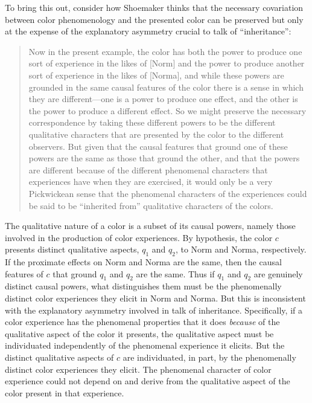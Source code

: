 \documentclass[12pt]{article}
\begin{document}
To bring this out, consider how Shoemaker thinks that the necessary covariation between color phenomenology and the presented color can be preserved but only at the expense of the explanatory asymmetry crucial to talk of ``inheritance'': 
\begin{quote}
	Now in the present example, the color has both the power to produce one sort of experience in the likes of [Norm] and the power to produce another sort of experience in the likes of [Norma], and while these powers are grounded in the same causal features of the color there is a sense in which they are different---one is a power to produce one effect, and the other is the power to produce a different effect. So we might preserve the necessary correspondence by taking these different powers to be the different qualitative characters that are presented by the color to the different observers. But given that the causal features that ground one of these powers are the same as those that ground the other, and that the powers are different because of the different phenomenal characters that experiences have when they are exercised, it would only be a very Pickwickean sense that the phenomenal characters of the experiences could be said to be ``inherited from'' qualitative characters of the colors. \citep[476, n. 8]{Shoemaker:2006vn} 
\end{quote}
The qualitative nature of a color is a subset of its causal powers, namely those involved in the production of color experiences. By hypothesis, the color \( c \) presents distinct qualitative aspects, \( q_1 \) and \( q_2 \), to Norm and Norma, respectively. If the proximate effects on Norm and Norma are the same, then the causal features of \( c \) that ground \( q_1 \) and \( q_2 \) are the same. Thus if \( q_1 \) and \( q_2 \) are genuinely distinct causal powers, what distinguishes them must be the phenomenally distinct color experiences they elicit in Norm and Norma. But this is inconsistent with the explanatory asymmetry involved in talk of inheritance. Specifically, if a color experience has the phenomenal properties that it does \emph{because} of the qualitative aspect of the color it presents, the qualitative aspect must be individuated independently of the phenomenal experience it elicits. But the distinct qualitative aspects of \( c \) are individuated, in part, by the phenomenally distinct color experiences they elicit. The phenomenal character of color experience could not depend on and derive from the qualitative aspect of the color present in that experience.
\end{document}
